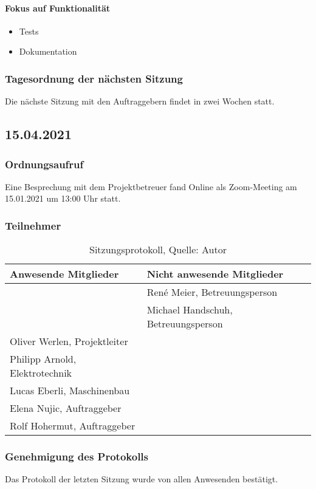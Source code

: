 \paragraph{Fokus auf Funktionalität}
\begin{itemize}
	\item Tests
	\item Dokumentation
\end{itemize}
\subsubsection{Tagesordnung der nächsten Sitzung}
Die nächste Sitzung mit den Auftraggebern findet in zwei Wochen statt. 
\newpage
\subsection{15.04.2021}
\subsubsection{Ordnungsaufruf}
Eine Besprechung mit dem Projektbetreuer fand Online als Zoom-Meeting am 15.01.2021 um 13:00 Uhr statt.
\subsubsection{Teilnehmer}
\begin{table}[H]
	\setlength\extrarowheight{2pt} %
	\begin{tabularx}{\textwidth}{|X|X|}
		\hline
		\textbf{Anwesende Mitglieder} &  \textbf{Nicht anwesende Mitglieder} \\
		\hline
		&  René Meier, Betreuungsperson   \\
		&  Michael Handschuh, Betreuungsperson   \\
		Oliver Werlen, Projektleiter &  \\
		Philipp Arnold, Elektrotechnik  &\\
		Lucas Eberli, Maschinenbau & \\
		Elena Nujic, Auftraggeber &  \\
		Rolf Hohermut, Auftraggeber &  \\
		\hline
	\end{tabularx}
	\caption{ \label{tbl: Teilnehmerliste vom 15.04.2021_2}Sitzungsprotokoll, Quelle: Autor}
\end{table}
\subsubsection{Genehmigung des Protokolls}
Das Protokoll der letzten Sitzung wurde von allen Anwesenden bestätigt.
